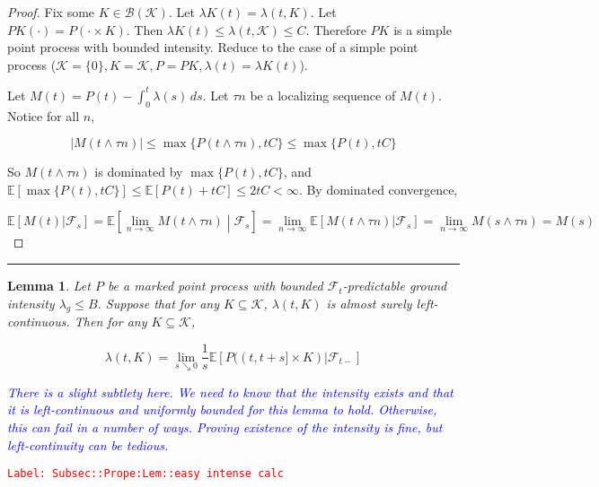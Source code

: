 \documentclass[12pt]{article}
\newcommand{\mb}{\mathbb}
\newcommand{\mc}{\mathcal}
\newcommand{\ms}{\mathscr}
\newcommand{\ra}{\rightarrow}
\newcommand{\tr}{\textcolor{red}}
\newcommand{\tb}{\textcolor{blue}}
\newcommand{\labe}[1]{\tr{\texttt{Label: #1}}}
\newcommand{\lin}{\rule{\linewidth}{0.4 pt}}
\newcommand{\ex}[1]{\mb{E}\left[#1\right]}			%
\renewcommand{\t}{t}							%
\renewcommand{\tt}{s}							%
\newcommand{\F}{\mc{F}}							%
\newcommand{\ts}[1]{_{#1}}						%
\newcommand{\const}{C}							%
\newcommand{\rate}{\lambda}						%
\newcommand{\rt}{\tau}							%
\newcommand{\rp}{P}								%
\newcommand{\mspce}{\mc{K}}						%
\newtheorem{lem}[thms]{Lemma}
\begin{document}
\begin{proof}
Fix some \(K \in \ms{B}(\mspce)\). Let \(\rate{K}(\t) = \rate(\t,K)\). Let \(\rp{K}(\cdot) = \rp(\cdot\times K)\). Then \(\rate{K}(\t) \leq \rate(\t,\mspce) \leq \const\). Therefore \(\rp{K}\) is a simple point process with bounded intensity. Reduce to the case of a simple point process (\(\mspce = \{0\}, K = \mspce, \rp = \rp{K},\rate(\t) = \rate{K}(\t)\)).

Let \(M(\t) = \rp(\t) - \int_0^\t \rate(\tt)\,ds\). Let \(\rt{n}\) be a localizing sequence of \(M(\t)\). Notice for all \(n\),

\[|M(\t\wedge \rt{n})| \leq \max\{\rp(\t\wedge \rt{n}),\t\const\}\leq \max\{\rp(\t),\t\const\}\]

So \(M(\t\wedge\rt{n})\) is dominated by \(\max\{\rp(\t),\t\const\}\), and \(\ex{\max\{\rp(\t),\t\const\}} \leq \ex{\rp(\t) + \t\const} \leq 2\t\const < \infty\). By dominated convergence,

\[\ex{M(\t)|\F\ts{\tt}} = \ex{\lim_{n\ra\infty} M(\t\wedge \rt{n})\middle|\F\ts{\tt}} = \lim_{n\ra\infty}\ex{M(\t\wedge \rt{n})|\F\ts{\tt}} = \lim_{n\ra\infty} M(\tt\wedge \rt{n}) = M(\tt)\]
\end{proof}

\lin

\begin{lem}
Let \(\rp\) be a marked point process with bounded \(\F\ts{\t}\)-predictable ground intensity \(\rate_g\leq B\). Suppose that for any \(K \subseteq \mspce\), \(\rate(\t,K)\) is almost surely left-continuous. Then for any \(K \subseteq \mspce\),

\[\rate(\t,K) = \lim_{s\searrow 0}\frac{1}{\tt}\ex{\rp((\t,\t+\tt]\times K)|\F\ts{\t-}}\]

\tb{There is a slight subtlety here. We need to know that the intensity exists and that it is left-continuous and uniformly bounded for this lemma to hold. Otherwise, this can fail in a number of ways. Proving existence of the intensity is fine, but left-continuity can be tedious.}

\label{Subsec::Prope:Lem::easy intense calc}
\end{lem}
\labe{Subsec::Prope:Lem::easy intense calc}
\end{document}
